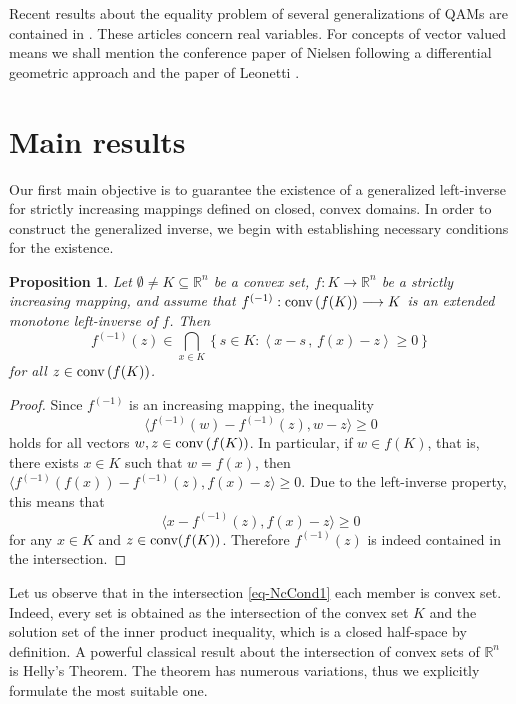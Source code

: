 \documentclass[12pt]{amsart}
\newtheorem{prop}{Proposition}%
\theoremstyle{remark}
\theoremstyle{definition}
\newcommand{\Rn}{\mathbb{R}^n}
\newcommand{\exmo}{extended monotone left-inverse }
\newcommand{\conv}{\mbox{\rm conv}}
\newcommand{\map}{\longrightarrow}
\begin{document}
Recent results about the equality problem 
of several generalizations of QAMs are contained in 
\cite{Bur19, GP20, KP26, LPZ20, PP26, PZ22}. 
These articles concern real variables. 
For concepts of vector valued means we 
shall mention the conference paper \cite{Nie23} of Nielsen 
following a differential geometric approach and the 
paper of Leonetti \cite{Leo23}. 

\section{Main results} 

Our first main objective is to guarantee the 
existence of a generalized left-inverse for strictly 
increasing mappings defined on closed, convex domains. 
In order to construct the generalized inverse, we begin 
with establishing necessary conditions for the existence. 

\begin{prop}\label{prop-NecessCond}
Let $ \emptyset \neq K \subseteq \Rn $ 
be a convex set, $ f : K \map \Rn $ 
be a strictly increasing mapping, and assume that 
$ f^{(-1)} : \conv \left( f(K) \right) \map K $ 
is an \exmo of $ f $. 
Then 
\begin{equation}\label{eq-NcCond1}
f^{(-1)}(z) \in 
\bigcap_{x \in K} 
\left\lbrace s \in K : 
\left\langle x - s \,,\, 
f(x)- z \right\rangle \geq 0 \right\rbrace  
\end{equation} 
for all $ z \in \conv \left( f(K) \right) $. 
\end{prop}

\begin{proof}
Since $ f^{(-1)} $ is an increasing mapping, the inequality 
\[
\langle  f^{(-1)}(w) -  f^{(-1)}(z) , w-z \rangle \geq 0 
\]
holds for all vectors 
$ w,z \in \conv \left( f(K) \right) $. 
In particular, if $ w \in f(K) $, that is, there exists 
$ x \in K $ such that $ w = f(x) $, then 
$
\langle  f^{(-1)}(f(x)) -  f^{(-1)}(z) , f(x)-z \rangle \geq 0. 
$
Due to the left-inverse property, this means that 
\[
\langle  x -  f^{(-1)}(z) , f(x)-z \rangle \geq 0 
\] 
for any $ x \in K $ and $ z \in \conv (f(K))$. Therefore 
$ f^{(-1)}(z) $ is indeed contained in 
the intersection. 
\end{proof}

Let us observe that in the intersection \eqref{eq-NcCond1} 
each member is convex set. Indeed, every set is obtained 
as the intersection of the convex set $ K $ and the 
solution set of the inner product inequality, which is a 
closed half-space by definition. 
A powerful classical result about the intersection of 
convex sets of $ \Rn $ is Helly's Theorem. The theorem 
has numerous variations, thus we explicitly formulate 
the most suitable one. 
\end{document}
